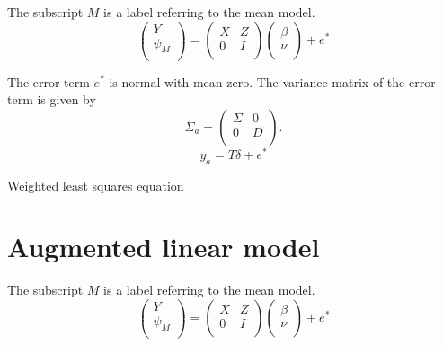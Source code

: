 \documentclass[12pt, a4paper]{article}
\begin{document}

The subscript $M$ is a label referring to the mean model.
\begin{equation}
\left(%
\begin{array}{c}
  Y \\
  \psi_{M} \\
\end{array}%
\right) = \left(
\begin{array}{cc}
  X & Z \\
  0 & I \\
\end{array}\right) \left(%
\begin{array}{c}
  \beta \\
  \nu \\
\end{array}%
\right)+ e^{*}
\end{equation}




The error term $e^{*}$ is normal with mean zero. The variance matrix of the error term is given by
\begin{equation}
\Sigma_{a} = \left(%
\begin{array}{cc}
  \Sigma & 0 \\
  0 & D \\
\end{array}%
\right).
\end{equation}
\begin{equation}
y_{a} = T \delta + e^{*}
\end{equation}

Weighted least squares equation





\section{Augmented linear model}
The subscript $M$ is a label referring to the mean model.
\begin{equation}
\left(%
\begin{array}{c}
Y \\
\psi_{M} \\
\end{array}%
\right) = \left(
\begin{array}{cc}
X & Z \\
0 & I \\
\end{array}\right) \left(%
\begin{array}{c}
\beta \\
\nu \\
\end{array}%
\right)+ e^{*}
\end{equation}
\end{document}
